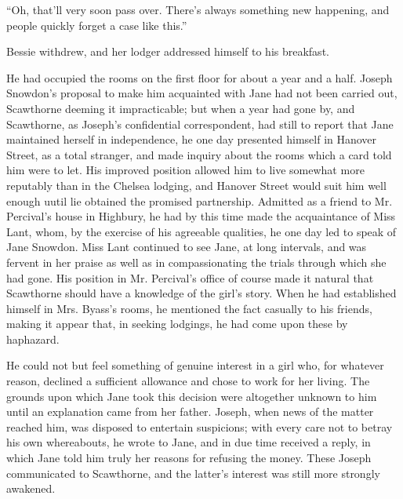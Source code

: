 ``Oh, that'll very soon pass over. There's always something new
happening, and people quickly forget a case like this.''

Bessie withdrew, and her lodger addressed himself to his breakfast.

He had occupied the rooms on the first floor for about a year and a
half. Joseph Snowdon's proposal to make him acquainted with Jane had not
been carried out, Scawthorne deeming it impracticable; but when a year
had gone by, and Scawthorne, as Joseph's confidential correspondent, had
still to report that Jane maintained herself in independence, he one day
presented himself in Hanover Street, as a total stranger, and made
inquiry about the rooms which a card told him were to let. His improved
position allowed him to live somewhat more reputably than in the Chelsea
lodging, and Hanover Street would suit him
{\protect\hypertarget{288}{}{}} well enough uutil lie obtained the
promised partnership. Admitted as a friend to Mr. Percival's house in
Highbury, he had by this time made the acquaintance of Miss Lant, whom,
by the exercise of his agreeable qualities, he one day led to speak of
Jane Snowdon. Miss Lant continued to see Jane, at long intervals, and
was fervent in her praise as well as in compassionating the trials
through which she had gone. His position in Mr. Percival's office of
course made it natural that Scawthorne should have a knowledge of the
girl's story. When he had established himself in Mrs. Byass's rooms, he
mentioned the fact casually to his friends, making it appear that, in
seeking lodgings, he had come upon these by haphazard.

He could not but feel something of genuine interest in a girl who, for
whatever reason, declined a sufficient allowance and chose to work for
her living. The grounds upon which Jane took this decision were
altogether unknown to him until an explanation came from her father.
Joseph, when news of the matter reached him, was disposed to entertain
suspicions; with every care not to betray his own whereabouts, he wrote
to Jane, and in due {\protect\hypertarget{289}{}{}} time received a
reply, in which Jane told him truly her reasons for refusing the money.
These Joseph communicated to Scawthorne, and the latter's interest was
still more strongly awakened.

